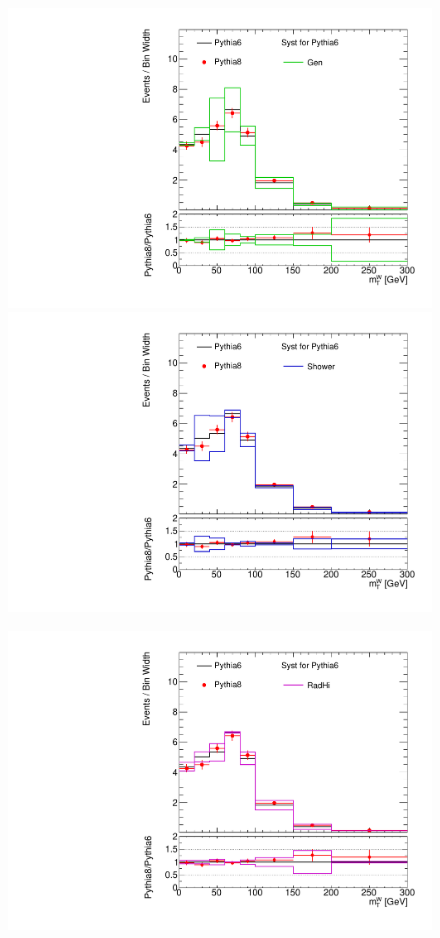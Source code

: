 \begin{figure}[!h]
\begin{center}
\includegraphics[scale=0.33]{./figures/boosted/TTBarPy6VsPy8/TTBarPy6VsPy8_SR_WlepMtATLAS_gen} 
\includegraphics[scale=0.33]{./figures/boosted/TTBarPy6VsPy8/TTBarPy6VsPy8_SR_WlepMtATLAS_shower} \\
\par\medskip
\includegraphics[scale=0.33]{./figures/boosted/TTBarPy6VsPy8/TTBarPy6VsPy8_SR_WlepMtATLAS_radhi}

\end{center}
\end{figure}
